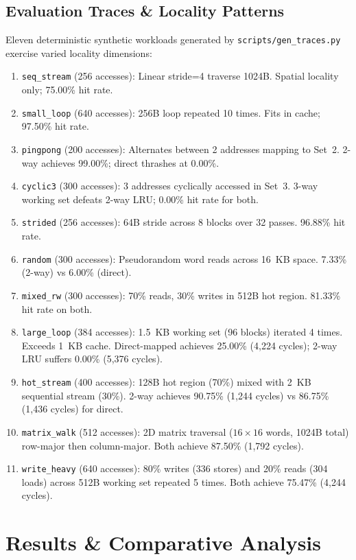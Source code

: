 \documentclass[journal,10pt,twocolumn]{IEEEtran}
\begin{document}
\subsection{Evaluation Traces \& Locality Patterns}
Eleven deterministic synthetic workloads generated by \texttt{scripts/gen\_traces.py} exercise varied locality dimensions:
\begin{enumerate}
    \item \texttt{seq\_stream} (256 accesses): Linear stride=4 traverse 1024B. Spatial locality only; 75.00\% hit rate.
    \item \texttt{small\_loop} (640 accesses): 256B loop repeated 10 times. Fits in cache; 97.50\% hit rate.
    \item \texttt{pingpong} (200 accesses): Alternates between 2 addresses mapping to Set~2. 2-way achieves 99.00\%; direct thrashes at 0.00\%.
    \item \texttt{cyclic3} (300 accesses): 3 addresses cyclically accessed in Set~3. 3-way working set defeats 2-way LRU; 0.00\% hit rate for both.
    \item \texttt{strided} (256 accesses): 64B stride across 8 blocks over 32 passes. 96.88\% hit rate.
    \item \texttt{random} (300 accesses): Pseudorandom word reads across 16~KB space. 7.33\% (2-way) vs 6.00\% (direct).
    \item \texttt{mixed\_rw} (300 accesses): 70\% reads, 30\% writes in 512B hot region. 81.33\% hit rate on both.
    \item \texttt{large\_loop} (384 accesses): 1.5~KB working set (96 blocks) iterated 4 times. Exceeds 1~KB cache. Direct-mapped achieves 25.00\% (4,224 cycles); 2-way LRU suffers 0.00\% (5,376 cycles).
    \item \texttt{hot\_stream} (400 accesses): 128B hot region (70\%) mixed with 2~KB sequential stream (30\%). 2-way achieves 90.75\% (1,244 cycles) vs 86.75\% (1,436 cycles) for direct.
    \item \texttt{matrix\_walk} (512 accesses): 2D matrix traversal ($16\times 16$ words, 1024B total) row-major then column-major. Both achieve 87.50\% (1,792 cycles).
    \item \texttt{write\_heavy} (640 accesses): 80\% writes (336 stores) and 20\% reads (304 loads) across 512B working set repeated 5 times. Both achieve 75.47\% (4,244 cycles).
\end{enumerate}

\section{Results \& Comparative Analysis}
\end{document}
